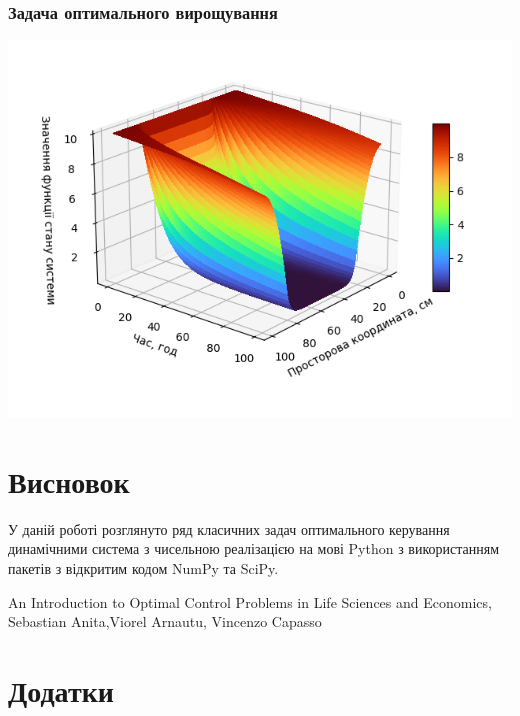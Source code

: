 \documentclass[a4paper,12pt]{extreport}
\begin{document}
\subsection{Задача оптимального вирощування}
\includegraphics[height=10cm, width=15cm]{figures/State_1d_task_3d_plot.png}
\chapter{Висновок} 
У даній роботі розглянуто ряд класичних задач оптимального керування динамічними система з чисельною
реалізацією на мові Python з використанням пакетів з відкритим кодом NumPy та SciPy. 

\newpage
{}
\begin{thebibliography}{9}
   
 An Introduction to Optimal Control Problems in Life Sciences and Economics, Sebastian Anita,Viorel Arnautu, Vincenzo Capasso
\end{thebibliography}
 
\chapter*{Додатки}
 
\end{document}
